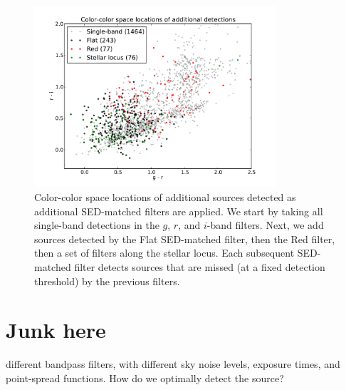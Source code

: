 \documentclass[letterpaper,preprint]{aastex}
\newcommand{\detmap}{detection map}
\newcommand{\commentout}[1]{}
\begin{document}
\begin{figure}
\begin{center}
\includegraphics[width=0.8\textwidth]{mdetect-18}
\caption{Color-color space locations of additional sources detected as
  additional SED-matched filters are applied.  We start by taking all
  single-band detections in the $g$, $r$, and $i$-band filters.  Next,
  we add sources detected by the Flat SED-matched filter, then the Red
  filter, then a set of filters along the stellar locus.  Each
  subsequent SED-matched filter detects sources that are missed (at a
  fixed detection threshold) by the previous filters.
  \label{fig:added}}
\end{center}
\end{figure}




\section{Junk here}






different bandpass filters, with different sky noise levels, exposure
times, and point-spread functions.  How do we optimally detect the
source?  \commentout{ We first compute the \detmap\ for each image,
  then compute a weighted sum of the individual \detmap s to produce a
  \emph{total \detmap}.  }
\end{document}
